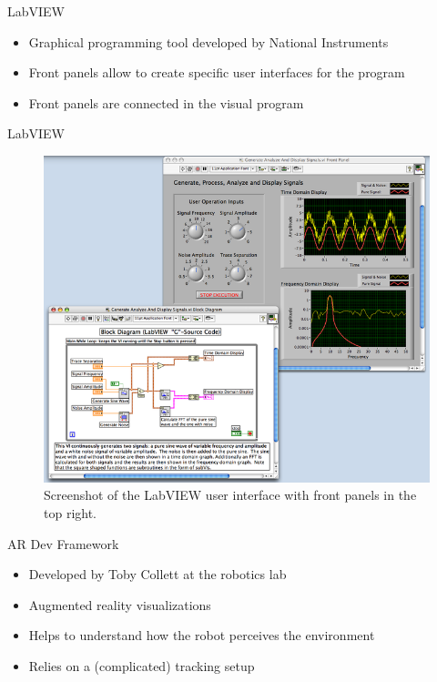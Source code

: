\documentclass[compress]{beamer}
\begin{document}
\begin{frame}{LabVIEW}
\begin{itemize}
\item Graphical programming tool developed by National Instruments
\item Front panels allow to create specific user interfaces for the program
\item Front panels are connected in the visual program
\end{itemize}
\end{frame}

\begin{frame}{LabVIEW}
\begin{figure}[htbp]
  \centering
  \includegraphics[width=.6\textwidth]{images/labview_frontpanel.png}
  \caption{Screenshot of the LabVIEW user interface with front panels in the top right.}
\end{figure}
\end{frame}

\begin{frame}{AR Dev Framework}
\begin{itemize}
\item Developed by Toby Collett at the robotics lab
\item Augmented reality visualizations
\item Helps to understand how the robot perceives the environment
\item Relies on a (complicated) tracking setup
\end{itemize}
\end{frame}
\end{document}

